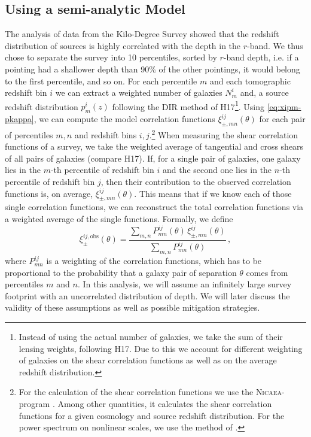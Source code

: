 \documentclass[referee]{aa} %
\renewcommand{\[}{\begin{equation}}
\renewcommand{\]}{\end{equation}}
\renewcommand{\rm}{\mathrm}
\begin{document}
\subsection{Using a semi-analytic Model}
The analysis of data from the Kilo-Degree Survey showed that the redshift distribution of sources is highly correlated with the depth in the $r$-band. We thus chose to separate the survey into 10 percentiles, sorted by $r$-band depth, i.e. if a pointing had a shallower depth than 90\% of the other pointings, it would belong to the first percentile, and so on. For each percentile $m$ and each tomographic redshift bin $i$ we can extract a weighted number of galaxies $N^i_m$ and, a source redshift distribution $p^i_m(z)$ following the DIR method of H17\footnote{Instead of using the actual number of galaxies, we take the sum of their lensing weights, following H17. Due to this we account for different weighting of galaxies on the shear correlation functions as well as on the average redshift distribution.}. Using \eqref{eq:xipm-pkappa}, we can compute the model correlation functions $\xi_{\pm,mn}^{ij}(\theta)$ for each pair of percentiles $m,n$ and redshift bins $i,j$.\footnote{For the calculation of the shear correlation functions we use the \textsc{Nicaea}-program \citep{10.1093/mnras/stx2082}. Among other quantities, it calculates the shear correlation functions for a given cosmology and source redshift distribution. For the power spectrum on nonlinear scales, we use the method of \citet{2012ApJ...761..152T}.} When measuring the shear correlation functions of a survey, we take the weighted average of tangential and cross shears of all pairs of galaxies (compare H17). If, for a single pair of galaxies, one galaxy lies in the $m$-th percentile of redshift bin $i$ and the second one lies in the $n$-th percentile of redshift bin $j$, then their contribution to the observed correlation functions is, on average, $\xi_{\pm,mn}^{ij}(\theta)$. This means that if we know each of those single correlation functions, we can reconstruct the total correlation functions via a weighted average of the single functions. Formally, we define \[
\xi_\pm^{ij,\rm{obs}}(\theta) = \frac{\sum_{m,n} P_{mn}^{ij}(\theta)\,\xi_{\pm,mn}^{ij}(\theta)}{\sum_{m,n} P_{mn}^{ij}(\theta)}\, ,
\label{eq:def_xiobs}
\]
where $P_{mn}^{ij}$ is a weighting of the correlation functions, which has to be proportional to the probability that a galaxy pair of separation $\theta$ comes from percentiles $m$ and $n$. In this analysis, we will assume an infinitely large survey footprint with an uncorrelated distribution of depth. We will later discuss the validity of these assumptions as well as possible mitigation strategies. 
\end{document}
